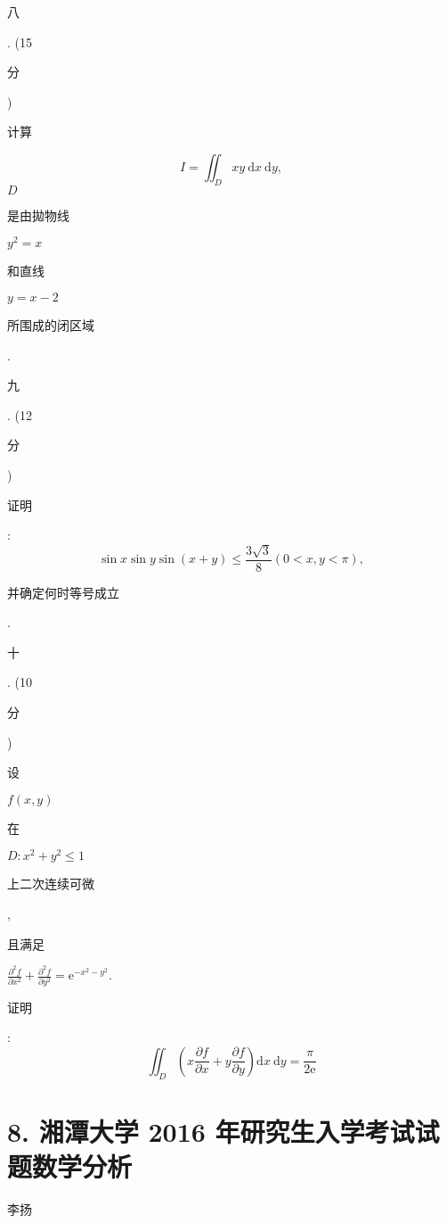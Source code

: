 \documentclass[10pt]{article}
\begin{document}
\begin{CJK}{UTF8}{mj}八\end{CJK}. (15 \begin{CJK}{UTF8}{mj}分\end{CJK}) \begin{CJK}{UTF8}{mj}计算\end{CJK}
$$
I=\iint_{D} x y \mathrm{~d} x \mathrm{~d} y,
$$
$D$ \begin{CJK}{UTF8}{mj}是由拋物线\end{CJK} $y^{2}=x$ \begin{CJK}{UTF8}{mj}和直线\end{CJK} $y=x-2$ \begin{CJK}{UTF8}{mj}所围成的闭区域\end{CJK}.

\begin{CJK}{UTF8}{mj}九\end{CJK}. (12 \begin{CJK}{UTF8}{mj}分\end{CJK}) \begin{CJK}{UTF8}{mj}证明\end{CJK}:
$$
\sin x \sin y \sin (x+y) \leqslant \frac{3 \sqrt{3}}{8}(0<x, y<\pi),
$$
\begin{CJK}{UTF8}{mj}并确定何时等号成立\end{CJK}. \begin{CJK}{UTF8}{mj}十\end{CJK}. (10 \begin{CJK}{UTF8}{mj}分\end{CJK}) \begin{CJK}{UTF8}{mj}设\end{CJK} $f(x, y)$ \begin{CJK}{UTF8}{mj}在\end{CJK} $D: x^{2}+y^{2} \leqslant 1$ \begin{CJK}{UTF8}{mj}上二次连续可微\end{CJK}, \begin{CJK}{UTF8}{mj}且满足\end{CJK} $\frac{\partial^{2} f}{\partial x^{2}}+\frac{\partial^{2} f}{\partial y^{2}}=\mathrm{e}^{-x^{2}-y^{2}}$. \begin{CJK}{UTF8}{mj}证明\end{CJK}:
$$
\iint_{D}\left(x \frac{\partial f}{\partial x}+y \frac{\partial f}{\partial y}\right) \mathrm{d} x \mathrm{~d} y=\frac{\pi}{2 \mathrm{e}}
$$

\section{8. 湘潭大学 2016 年研究生入学考试试题数学分析}
\begin{CJK}{UTF8}{mj}李扬\end{CJK}
\end{document}
